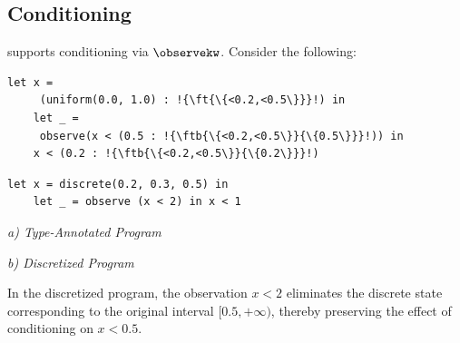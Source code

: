 \subsection{Conditioning}\label{sec:examples:6}

\Slice{} supports conditioning via $\observekw$. Consider the following: %

%

\begin{center}
    \begin{minipage}[c]{0.58\linewidth}
    \centering
    \begin{lstlisting}[aboveskip=0.6em,belowskip=0.6em,escapechar=!,gobble=4]
    let x =
     (uniform(0.0, 1.0) : !{\ft{\{<0.2,<0.5\}}}!) in
    let _ =
     observe(x < (0.5 : !{\ftb{\{<0.2,<0.5\}}{\{0.5\}}}!)) in
    x < (0.2 : !{\ftb{\{<0.2,<0.5\}}{\{0.2\}}}!)
    \end{lstlisting}
    \end{minipage}
    \hfill
    \begin{minipage}[c]{0.4\linewidth}
    \centering
    \begin{minipage}{0.92\linewidth}
    \begin{lstlisting}[aboveskip=0.6em,belowskip=0.6em,gobble=4]
    let x = discrete(0.2, 0.3, 0.5) in
    let _ = observe (x < 2) in x < 1
    \end{lstlisting}
    \end{minipage}
    \end{minipage}

    \smallskip
    \begin{minipage}{0.42\linewidth}
    \centering
    \textit{a) Type-Annotated Program}
    \end{minipage}
    \hfill
    \begin{minipage}{0.4\linewidth}
    \centering
    \textit{b) Discretized Program}
    \end{minipage}
    \label{fig:examples:6}
\end{center}
\vspace{0.6em}

\noindent
In the discretized program, the observation $x<2$ eliminates the discrete state corresponding to the original interval $[0.5,+\infty)$, thereby preserving the effect of conditioning on $x<0.5$.

